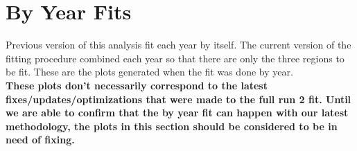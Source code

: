 \section{By Year Fits}
Previous version of this analysis fit each year by itself. The current version of the fitting procedure combined each year so that there are only the three regions to be fit. These are the plots generated when the fit was done by year. 
\\
\textbf{These plots don't necessarily correspond to the latest fixes/updates/optimizations that were made to the full run 2 fit. Until we are able to confirm that the by year fit can happen with our latest methodology, the plots in this
section should be considered to be in need of fixing.} \\
